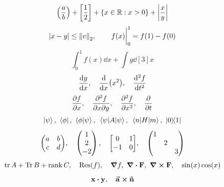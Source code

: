 \documentclass{amsart}
\begin{document}
\[ \qty(\frac{a}{b}) + \qty[\frac{1}{2}] + \qty{x \in \mathbb{R} : x > 0} + \qty|\frac{x}{y}| \]
\[ \abs{x - y} \le \norm{v}_2, \qquad \eval{f(x)}_{0}^{1} = f(1) - f(0) \]
\[ \int_0^1 f(x) \dd{x} + \int g \dd[3]{x} \]
\[ \dv{y}{x}, \quad \dv{x} \qty(x^2), \quad \dv[2]{f}{t} \]
\[ \pdv{f}{x}, \quad \pdv{f}{x}{y}, \quad \pdv[2]{f}{x}, \quad \pdv{}{t} \]
\[ \ket{\psi}, \ \bra{\phi}, \ \braket{\phi}{\psi}, \ \ev{A}{\psi}, \ \mel{n}{H}{m}, \ \op{0}{1} \]
\[ \mqty(a & b \\ c & d), \quad \pmqty{1 \\ 2 \\ -2}, \quad \mqty[0 & 1 \\ -1 & 0], \quad \mqty(\dmat{1,2,3}) \]
\[ \tr A + \Tr B + \rank C, \quad \Res(f), \quad \grad f, \ \div \vb{F}, \ \curl \vb{F}, \quad \sin(x)\cos(x) \]
\[ \vb{x} \vdot \vb{y}, \quad \va{a} \cross \vu{n} \]
\end{document}
